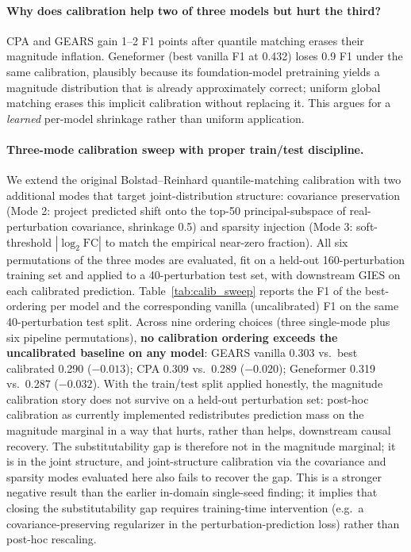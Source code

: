\documentclass{article}
\theoremstyle{plain}
\theoremstyle{definition}
\theoremstyle{remark}
\begin{document}
\paragraph{Why does calibration help two of three models but hurt the third?}
CPA and GEARS gain 1--2 F1 points after quantile matching erases their magnitude inflation. Geneformer (best vanilla F1 at 0.432) loses 0.9 F1 under the same calibration, plausibly because its foundation-model pretraining yields a magnitude distribution that is already approximately correct; uniform global matching erases this implicit calibration without replacing it. This argues for a \emph{learned} per-model shrinkage rather than uniform application.

\paragraph{Three-mode calibration sweep with proper train/test discipline.}
\label{sec:calib-sweep}
We extend the original Bolstad--Reinhard quantile-matching calibration with two additional modes that target joint-distribution structure: covariance preservation (Mode 2: project predicted shift onto the top-50 principal-subspace of real-perturbation covariance, shrinkage 0.5) and sparsity injection (Mode 3: soft-threshold $|\log_2 \mathrm{FC}|$ to match the empirical near-zero fraction). All six permutations of the three modes are evaluated, fit on a held-out 160-perturbation training set and applied to a 40-perturbation test set, with downstream GIES on each calibrated prediction. Table~\ref{tab:calib_sweep} reports the F1 of the best-ordering per model and the corresponding vanilla (uncalibrated) F1 on the same 40-perturbation test split. Across nine ordering choices (three single-mode plus six pipeline permutations), \textbf{no calibration ordering exceeds the uncalibrated baseline on any model}: GEARS vanilla 0.303 vs.\ best calibrated 0.290 ($-0.013$); CPA 0.309 vs.\ 0.289 ($-0.020$); Geneformer 0.319 vs.\ 0.287 ($-0.032$). With the train/test split applied honestly, the magnitude calibration story does not survive on a held-out perturbation set: post-hoc calibration as currently implemented redistributes prediction mass on the magnitude marginal in a way that hurts, rather than helps, downstream causal recovery. The substitutability gap is therefore not in the magnitude marginal; it is in the joint structure, and joint-structure calibration via the covariance and sparsity modes evaluated here also fails to recover the gap. This is a stronger negative result than the earlier in-domain single-seed finding; it implies that closing the substitutability gap requires training-time intervention (e.g.\ a covariance-preserving regularizer in the perturbation-prediction loss) rather than post-hoc rescaling.
\end{document}
